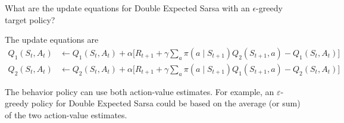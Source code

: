 
\begin{exercise}

What are the update equations for Double Expected Sarsa with an $\epsilon$-greedy target policy?

\end{exercise}


\begin{solution}

The update equations are
\begin{align*}
  Q_1(S_t, A_t)
  &\leftarrow
  Q_1(S_t, A_t) + \alpha \big[R_{t+1} + \gamma \sum_a \pi(a\mid S_{t+1}) Q_2(S_{t+1},a) - Q_1(S_t,A_t)\big] \\
  Q_2(S_t, A_t)
  &\leftarrow
  Q_2(S_t, A_t) + \alpha \big[R_{t+1} + \gamma \sum_a \pi(a\mid S_{t+1}) Q_1(S_{t+1},a) - Q_2(S_t,A_t)\big]
\end{align*}

The behavior policy can use both action-value estimates. For example, an $\varepsilon$-greedy policy for Double Expected Sarsa could be based on the average (or sum) of the two action-value estimates.
\end{solution}

